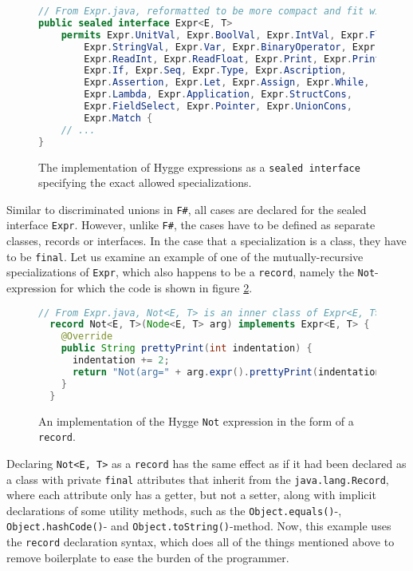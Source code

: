 \begin{figure}[H]
\centering 
\begin{lstlisting}[language=Java]
// From Expr.java, reformatted to be more compact and fit within the margins
public sealed interface Expr<E, T>
    permits Expr.UnitVal, Expr.BoolVal, Expr.IntVal, Expr.FloatVal,
        Expr.StringVal, Expr.Var, Expr.BinaryOperator, Expr.Not,
        Expr.ReadInt, Expr.ReadFloat, Expr.Print, Expr.PrintLn,
        Expr.If, Expr.Seq, Expr.Type, Expr.Ascription,
        Expr.Assertion, Expr.Let, Expr.Assign, Expr.While,
        Expr.Lambda, Expr.Application, Expr.StructCons,
        Expr.FieldSelect, Expr.Pointer, Expr.UnionCons,
        Expr.Match {
    // ...
}
\end{lstlisting}
\caption{The implementation of Hygge expressions as a \texttt{sealed interface} specifying the exact allowed specializations.}
\label{fig:expr_sealed_interface}
\end{figure}

Similar to discriminated unions in \texttt{F\#}, all cases are declared for the sealed interface \texttt{Expr}. However, unlike \texttt{F\#},
the cases have to be defined as separate classes, records or interfaces. In the case that a specialization is a class, they have to be \texttt{final}.
Let us examine an example of one of the mutually-recursive specializations of \texttt{Expr}, which also happens to be a \texttt{record}\cite{java_record}, namely the \texttt{Not}-expression for which the code is shown in figure \ref{fig:not_record}.

\begin{figure}[H]
\centering
\begin{lstlisting}[language=Java]
  // From Expr.java, Not<E, T> is an inner class of Expr<E, T>
  record Not<E, T>(Node<E, T> arg) implements Expr<E, T> {
    @Override
    public String prettyPrint(int indentation) {
      indentation += 2;
      return "Not(arg=" + arg.expr().prettyPrint(indentation) + ")";
    }
  }
\end{lstlisting}
\caption{An implementation of the Hygge \texttt{Not} expression in the form of a \texttt{record}.}
\label{fig:not_record}
\end{figure}

Declaring \texttt{Not<E, T>} as a \texttt{record} has the same effect as if it had been declared as a class with private \texttt{final}
attributes that inherit from the \texttt{java.lang.Record}, where each attribute only has a getter, but not a setter, along with implicit declarations
of some utility methods, such as the \texttt{Object.equals()}-, \texttt{Object.hashCode()}- and \texttt{Object.toString()}-method. Now, this example uses the
\texttt{record} declaration syntax, which does all of the things mentioned above to remove boilerplate to ease the burden of the programmer.

